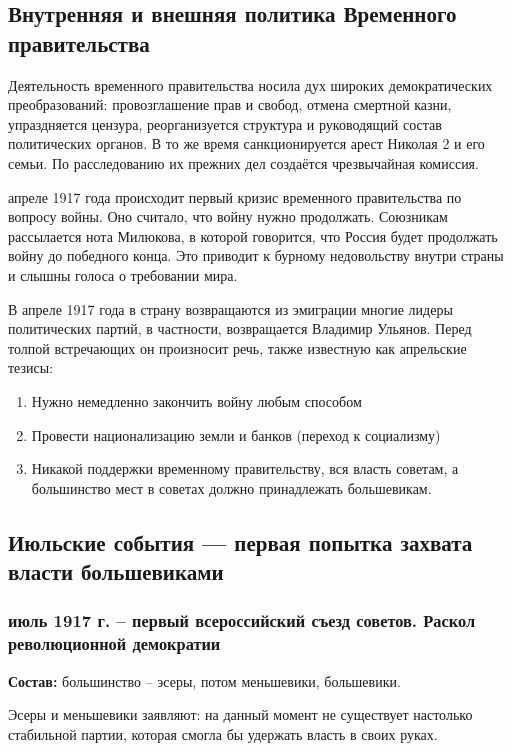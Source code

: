 \subsection{Внутренняя и внешняя политика Временного правительства}

Деятельность временного правительства носила дух широких демократических преобразований: провозглашение прав и свобод, отмена смертной казни, упраздняется цензура, реорганизуется структура и руководящий состав политических органов. В то же время санкционируется арест Николая 2 и его семьи. По расследованию их прежних дел создаётся чрезвычайная комиссия.

 апреле 1917 года происходит первый кризис временного правительства по вопросу войны. Оно считало, что войну нужно продолжать. Союзникам рассылается нота Милюкова, в которой говорится, что Россия будет продолжать войну до победного конца. Это приводит к бурному недовольству внутри страны и слышны голоса о требовании мира.
 
В апреле 1917 года в страну возвращаются из эмиграции многие лидеры политических партий, в частности, возвращается Владимир Ульянов. Перед толпой встречающих он произносит речь, также известную как апрельские тезисы:

\begin{enumerate}
    \item Нужно немедленно закончить войну любым способом
    \item Провести национализацию земли и банков (переход к социализму)
    \item Никакой поддержки временному правительству, вся власть советам, а большинство мест в советах должно принадлежать большевикам.
\end{enumerate}

\subsection{Июльские события — первая попытка захвата власти большевиками}

\subsubsection{июль 1917 г. – первый всероссийский съезд советов. Раскол революционной демократии}

\textbf{Состав:} большинство – эсеры, потом меньшевики, большевики.

Эсеры и меньшевики заявляют: на данный момент не существует настолько стабильной партии, которая смогла бы удержать власть в своих руках.

